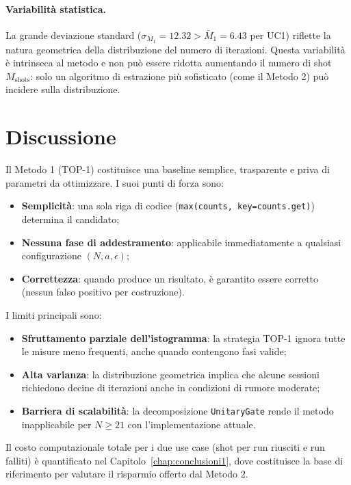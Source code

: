 \begin{onehalfspace}
\paragraph{Variabilità statistica.}
La grande deviazione standard ($\sigma_{M_1} = 12.32 > \bar{M}_1 = 6.43$ per UC1) riflette la natura geometrica della distribuzione del numero di iterazioni. Questa variabilità è intrinseca al metodo e non può essere ridotta aumentando il numero di shot $M_{\text{shots}}$: solo un algoritmo di estrazione più sofisticato (come il Metodo 2) può incidere sulla distribuzione.

\section{Discussione}
\label{sec:discussione_m1}

Il Metodo 1 (TOP-1) costituisce una baseline semplice, trasparente e priva di parametri da ottimizzare. I suoi punti di forza sono:
\begin{itemize}
    \item \textbf{Semplicità}: una sola riga di codice (\texttt{max(counts, key=counts.get)}) determina il candidato;
    \item \textbf{Nessuna fase di addestramento}: applicabile immediatamente a qualsiasi configurazione $(N, a, \epsilon)$;
    \item \textbf{Correttezza}: quando produce un risultato, è garantito essere corretto (nessun falso positivo per costruzione).
\end{itemize}

I limiti principali sono:
\begin{itemize}
    \item \textbf{Sfruttamento parziale dell'istogramma}: la strategia TOP-1 ignora tutte le misure meno frequenti, anche quando contengono fasi valide;
    \item \textbf{Alta varianza}: la distribuzione geometrica implica che alcune sessioni richiedono decine di iterazioni anche in condizioni di rumore moderate;
    \item \textbf{Barriera di scalabilità}: la decomposizione \texttt{UnitaryGate} rende il metodo inapplicabile per $N \geq 21$ con l'implementazione attuale.
\end{itemize}

Il costo computazionale totale per i due use case (shot per run riusciti e run falliti) è quantificato nel Capitolo~\ref{chap:conclusioni1}, dove costituisce la base di riferimento per valutare il risparmio offerto dal Metodo 2.

\end{onehalfspace}
